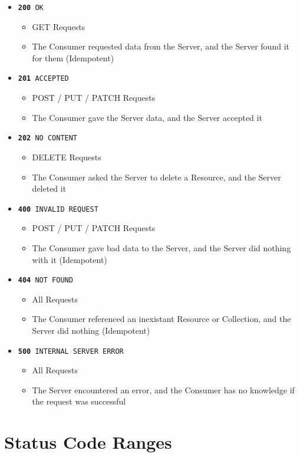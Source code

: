 \documentclass{book}
\begin{document}
\begin{itemize}
\item \texttt{\textbf{200} OK}
    \begin{itemize}
    \item GET Requests
    \item The Consumer requested data from the Server, and the Server found it for them (Idempotent)
    \end{itemize}
\item \texttt{\textbf{201} ACCEPTED}
    \begin{itemize}
    \item POST / PUT / PATCH Requests
    \item The Consumer gave the Server data, and the Server accepted it
    \end{itemize}
\item \texttt{\textbf{202} NO CONTENT}
    \begin{itemize}
    \item DELETE Requests
    \item The Consumer asked the Server to delete a Resource, and the Server deleted it
    \end{itemize}
\item \texttt{\textbf{400} INVALID REQUEST}
    \begin{itemize}
    \item POST / PUT / PATCH Requests
    \item The Consumer gave bad data to the Server, and the Server did nothing with it (Idempotent)
    \end{itemize}
\item \texttt{\textbf{404} NOT FOUND}
    \begin{itemize}
    \item All Requests
    \item The Consumer referenced an inexistant Resource or Collection, and the Server did nothing (Idempotent)
    \end{itemize}
\item \texttt{\textbf{500} INTERNAL SERVER ERROR}
    \begin{itemize}
    \item All Requests
    \item The Server encountered an error, and the Consumer has no knowledge if the request was successful
    \end{itemize}
\end{itemize}

\section{Status Code Ranges}
\end{document}

